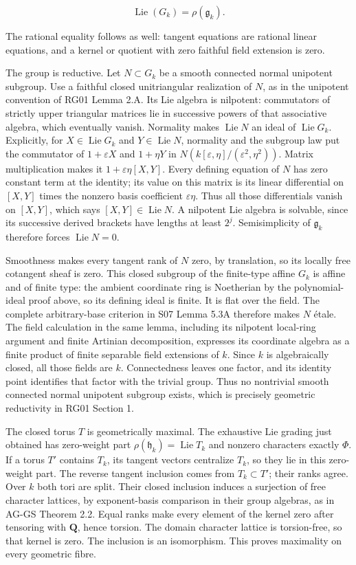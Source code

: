 \documentclass[11pt,a4paper,openany]{report}
\begin{document}
\[
\operatorname{Lie}(G_k)=\rho(\mathfrak g_k).
\]

The rational equality follows as well: tangent equations are rational linear equations, and a kernel or quotient with zero faithful field extension is zero.

The group is reductive. Let \(N\subset G_k\) be a smooth connected normal unipotent subgroup. Use a faithful closed unitriangular realization of \(N\), as in the unipotent convention of RG01 Lemma 2.A. Its Lie algebra is nilpotent: commutators of strictly upper triangular matrices lie in successive powers of that associative algebra, which eventually vanish. Normality makes \(\operatorname{Lie}N\) an ideal of \(\operatorname{Lie}G_k\). Explicitly, for \(X\in\operatorname{Lie}G_k\) and \(Y\in\operatorname{Lie}N\), normality and the subgroup law put the commutator of \(1+\varepsilon X\) and \(1+\eta Y\) in \(N(k[\varepsilon,\eta]/(\varepsilon^2,\eta^2))\). Matrix multiplication makes it \(1+\varepsilon\eta[X,Y]\). Every defining equation of \(N\) has zero constant term at the identity; its value on this matrix is its linear differential on \([X,Y]\) times the nonzero basis coefficient \(\varepsilon\eta\). Thus all those differentials vanish on \([X,Y]\), which says \([X,Y]\in\operatorname{Lie}N\). A nilpotent Lie algebra is solvable, since its successive derived brackets have lengths at least \(2^j\). Semisimplicity of \(\mathfrak g_k\) therefore forces \(\operatorname{Lie}N=0\).

Smoothness makes every tangent rank of \(N\) zero, by translation, so its locally free cotangent sheaf is zero. This closed subgroup of the finite-type affine \(G_k\) is affine and of finite type: the ambient coordinate ring is Noetherian by the polynomial-ideal proof above, so its defining ideal is finite. It is flat over the field. The complete arbitrary-base criterion in S07 Lemma 5.3A therefore makes \(N\) étale. The field calculation in the same lemma, including its nilpotent local-ring argument and finite Artinian decomposition, expresses its coordinate algebra as a finite product of finite separable field extensions of \(k\). Since \(k\) is algebraically closed, all those fields are \(k\). Connectedness leaves one factor, and its identity point identifies that factor with the trivial group. Thus no nontrivial smooth connected normal unipotent subgroup exists, which is precisely geometric reductivity in RG01 Section 1.

The closed torus \(T\) is geometrically maximal. The exhaustive Lie grading just obtained has zero-weight part \(\rho(\mathfrak h_k)=\operatorname{Lie}T_k\) and nonzero characters exactly \(\Phi\). If a torus \(T'\) contains \(T_k\), its tangent vectors centralize \(T_k\), so they lie in this zero-weight part. The reverse tangent inclusion comes from \(T_k\subset T'\); their ranks agree. Over \(k\) both tori are split. Their closed inclusion induces a surjection of free character lattices, by exponent-basis comparison in their group algebras, as in AG-GS Theorem 2.2. Equal ranks make every element of the kernel zero after tensoring with \(\mathbf Q\), hence torsion. The domain character lattice is torsion-free, so that kernel is zero. The inclusion is an isomorphism. This proves maximality on every geometric fibre.
\end{document}
